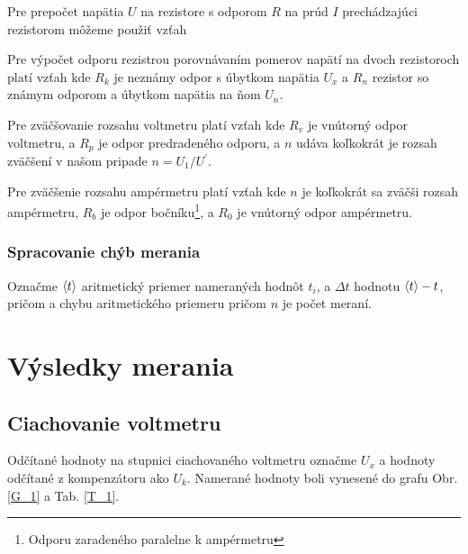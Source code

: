 \documentclass[a4paper,10pt]{article}
\begin{document}
Pre prepočet napätia $U$ na rezistore s odporom $R$ na prúd $I$ prechádzajúci rezistorom môžeme použiť vzťah


Pre výpočet odporu rezistrou porovnávaním pomerov napätí na dvoch rezistoroch platí vzťah
kde $R_k$ je neznámy odpor s úbytkom napätia $U_x$ a $R_n$ rezistor so známym odporom a úbytkom napätia na ňom $U_n$.


Pre zväčšovanie rozsahu voltmetru platí vzťah
kde $R_v$ je vnútorný odpor voltmetru, a $R_p$ je odpor predradeného odporu, a $n$ udáva koľkokrát je rozsah zväčšení v našom pripade $n = U_1/U^\prime$.

Pre zväčšenie rozsahu ampérmetru platí vzťah
kde $n$ je koľkokrát sa zväčši rozsah ampérmetru, $R_b$ je odpor bočníku\footnote{Odporu zaradeného paralelne k ampérmetru}, a $R_0$ je vnútorný odpor ampérmetru. 




\subsubsection{Spracovanie chýb merania}

Označme $\left< t \right>$ aritmetický priemer nameraných hodnôt $t_i$, a $\Delta t$ hodnotu $\left< t \right>-t$, pričom 
a chybu aritmetického priemeru 
pričom $n$ je počet meraní.


\section{Výsledky merania}


\subsection{Ciachovanie voltmetru}

Odčítané hodnoty na stupnici ciachovaného voltmetru označme $U_x$ a hodnoty odčítané z kompenzátoru
ako $U_k$. Namerané hodnoty boli vynesené do grafu Obr. \ref{G_1} a Tab. \ref{T_1}.
\end{document}

